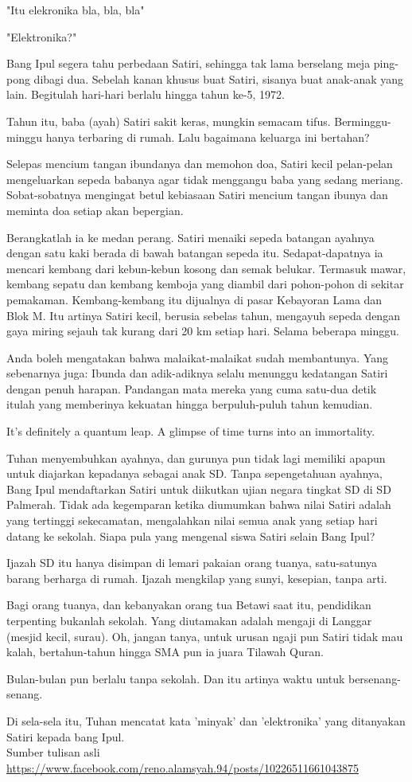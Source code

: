 "Itu elekronika bla, bla, bla"

"Elektronika?"

Bang Ipul segera tahu perbedaan Satiri, sehingga tak lama berselang meja ping-pong dibagi dua. Sebelah kanan khusus buat Satiri, sisanya buat anak-anak yang lain. Begitulah hari-hari berlalu hingga tahun ke-5, 1972.

Tahun itu, baba (ayah) Satiri sakit keras, mungkin semacam tifus. Berminggu-minggu hanya terbaring di rumah. Lalu bagaimana keluarga ini bertahan?

Selepas mencium tangan ibundanya dan memohon doa, Satiri kecil pelan-pelan mengeluarkan sepeda babanya agar tidak menggangu baba yang sedang meriang. Sobat-sobatnya mengingat betul kebiasaan Satiri mencium tangan ibunya dan meminta doa setiap akan bepergian.

Berangkatlah ia ke medan perang. Satiri menaiki sepeda batangan ayahnya dengan satu kaki berada di bawah batangan sepeda itu. Sedapat-dapatnya ia mencari kembang dari kebun-kebun kosong dan semak belukar. Termasuk mawar, kembang sepatu dan kembang kemboja yang diambil dari pohon-pohon di sekitar pemakaman. Kembang-kembang itu dijualnya di pasar Kebayoran Lama dan Blok M. Itu artinya Satiri kecil, berusia sebelas tahun, mengayuh sepeda dengan gaya miring sejauh tak kurang dari 20 km setiap hari. Selama beberapa minggu.

Anda boleh mengatakan bahwa malaikat-malaikat sudah membantunya. Yang sebenarnya juga: Ibunda dan adik-adiknya selalu menunggu kedatangan Satiri dengan penuh harapan. Pandangan mata mereka yang cuma satu-dua detik itulah yang memberinya kekuatan hingga berpuluh-puluh tahun kemudian.

It's definitely a quantum leap. A glimpse of time turns into an immortality.

Tuhan menyembuhkan ayahnya, dan gurunya pun tidak lagi memiliki apapun untuk diajarkan kepadanya sebagai anak SD. Tanpa sepengetahuan ayahnya, Bang Ipul mendaftarkan Satiri untuk diikutkan ujian negara tingkat SD di SD Palmerah. Tidak ada kegemparan ketika diumumkan bahwa nilai Satiri adalah yang tertinggi sekecamatan, mengalahkan nilai semua anak yang setiap hari datang ke sekolah. Siapa pula yang mengenal siswa Satiri selain Bang Ipul?

Ijazah SD itu hanya disimpan di lemari pakaian orang tuanya, satu-satunya barang berharga di rumah. Ijazah mengkilap yang sunyi, kesepian, tanpa arti.

Bagi orang tuanya, dan kebanyakan orang tua Betawi saat itu, pendidikan terpenting bukanlah sekolah. Yang diutamakan adalah mengaji di Langgar (mesjid kecil, surau). Oh, jangan tanya, untuk urusan ngaji pun Satiri tidak mau kalah, bertahun-tahun hingga SMA pun ia juara Tilawah Quran.

Bulan-bulan pun berlalu tanpa sekolah. Dan itu artinya waktu untuk bersenang-senang.

Di sela-sela itu, Tuhan mencatat kata 'minyak' dan 'elektronika' yang ditanyakan Satiri kepada bang Ipul.
\\[10pt]


Sumber tulisan asli \url{https://www.facebook.com/reno.alamsyah.94/posts/10226511661043875}

